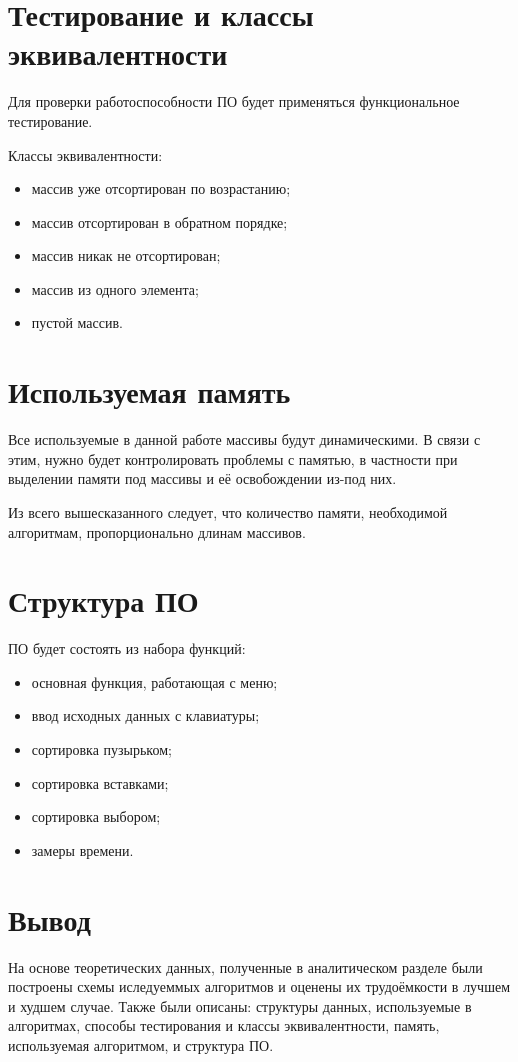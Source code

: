 \documentclass[12pt]{report}
\begin{document}
	\section{Тестирование и классы эквивалентности}
	Для проверки работоспособности ПО будет применяться функциональное тестирование.
	
	Классы эквивалентности:
	
	\begin{itemize}
		\item массив уже отсортирован по возрастанию;
		\item массив отсортирован в обратном порядке;
		\item массив никак не отсортирован;
		\item массив из одного элемента;
		\item пустой массив.
	\end{itemize}
	
	\section{Используемая память}
	Все используемые в данной работе массивы будут динамическими. В связи с этим, нужно будет контролировать проблемы с памятью, в частности при выделении памяти под массивы и её освобождении из-под них.
	
	Из всего вышесказанного следует, что количество памяти, необходимой алгоритмам, пропорционально длинам массивов.
	
	\section{Структура ПО}
	ПО будет состоять из набора функций:
	
	\begin{itemize}
		\item основная функция, работающая с меню;
		\item ввод исходных данных с клавиатуры;
		\item сортировка пузырьком;
		\item сортировка вставками;
		\item сортировка выбором;
		\item замеры времени.
	\end{itemize}
	
	\section{Вывод}
	На основе теоретических данных, полученные в аналитическом разделе были построены схемы иследуеммых  алгоритмов и оценены их трудоёмкости в лучшем и худшем случае. Также были описаны: структуры данных, используемые в алгоритмах, способы тестирования и классы эквивалентности, память, используемая алгоритмом, и структура ПО.
	
\end{document}
